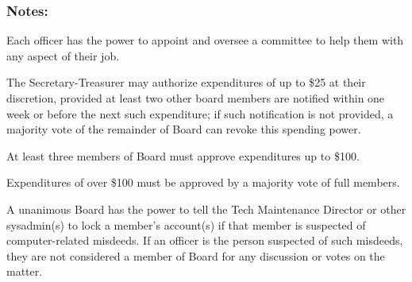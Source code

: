 		\subsubsection{Notes:}

Each officer has the power to appoint and oversee a committee to help them with any aspect of their job.

The Secretary-Treasurer may authorize expenditures of up to \$25 at their discretion, provided at least two other board members are notified within one week or before the next such expenditure; if such notification is not provided, a majority vote of the remainder of Board can revoke this spending power.

At least three members of Board must approve expenditures up to \$100.

Expenditures of over \$100 must be approved by a majority vote of full members.

A unanimous Board has the power to tell the Tech Maintenance Director or other sysadmin(s) to lock a member's account(s) if that member is suspected of computer-related misdeeds. If an officer is the person suspected of such misdeeds, they are not considered a member of Board for any discussion or votes on the matter.
